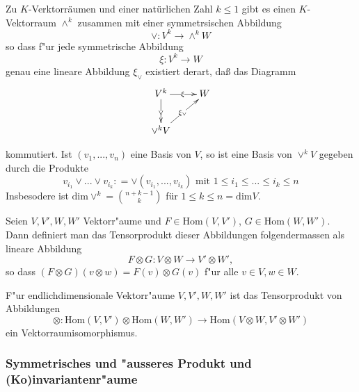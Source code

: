 \documentclass[11pt, a4paper]{article}
\begin{document}
\begin{theorem}
Zu $K$-Verktorräumen und einer natürlichen Zahl $k \leq 1$ gibt es einen $K$-Vektorraum
$\wedge^k$  zusammen mit einer symmetrsischen Abbildung 
$$
\vee: V^k \rightarrow \wedge ^k W
$$
so dass f"ur jede symmetrische Abbildung 
$$
\xi: V^k \rightarrow W
$$
genau eine lineare Abbildung $\xi_{\vee}$ existiert derart, daß das Diagramm 
\begin{gather*}
\xymatrix{V^k   \ar[d]|{\vee} \ar[r]|{\xi} & W\\
\vee^k V \ar[ur]|{\xi_\vee} & }
\end{gather*}

kommutiert. Ist $(v_1,...,v_n)$ eine Basis von $V$, so ist eine Basis von $\vee^k V$ gegeben durch die Produkte 
$$
v_{i_1} \vee ... \vee v_{i_k} : =  \vee (v_{i_1}, ..., v_{i_k}) \text{ mit } 1 \leq i_1 \leq ... \leq  i_k \leq n
$$
Insbesodere ist $\mathrm{dim}\vee^k = \binom{n+k-1}{k}$ für $ 1 \leq k \leq n = \mathrm{dim}V$. 
\end{theorem}


\begin{definition}
Seien $V, V', W, W'$ Vektorr"aume und $F \in \mathrm{Hom}(V, V')$, $G \in \mathrm{Hom}(W, W')$. Dann definiert man das Tensorprodukt dieser Abbildungen folgendermassen als lineare Abbildung
$$
F \otimes G: V \otimes W \rightarrow V' \otimes W',
$$
so dass $(F \otimes G)(v \otimes w) = F(v) \otimes G(v)$ f"ur alle $v\in V, w \in W$.
\end{definition}

\begin{theorem}
F"ur endlichdimensionale Vektorr"aume $V, V', W, W'$ ist das Tensorprodukt von Abbildungen 
$$
\otimes: \mathrm{Hom}(V, V') \otimes  \mathrm{Hom}(W, W') \rightarrow \mathrm{Hom}(V \otimes W, V' \otimes W')
$$
ein Vektorraumisomorphismus.
\end{theorem}


\subsubsection{Symmetrisches und "ausseres Produkt und (Ko)invariantenr"aume}
\end{document}
